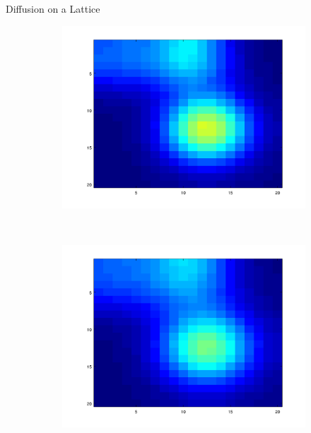 \documentclass{beamer}
\begin{document}
\begin{frame}{Diffusion on a Lattice}
\begin{figure}[!h]
\begin{subfigure}[b]{0.25\textwidth}
    	\includegraphics[width= \textwidth]{images/anim_110.png}
    \end{subfigure}~
    \begin{subfigure}[b]{0.25\textwidth}
    	\includegraphics[width= \textwidth]{images/anim_145.png}
    \end{subfigure}\\
    \begin{subfigure}[b]{0.25\textwidth}

\end{subfigure}
\end{figure}
\end{frame}
\end{document}
